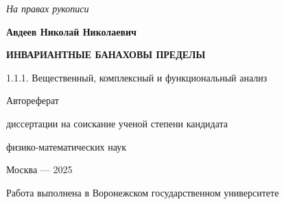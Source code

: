 \documentclass[12pt]{article}
\renewcommand{\baselinestretch}{1.3}
\begin{document}
\large

\thispagestyle{empty}

\begin{flushright}
\textit{На правах рукописи}
\end{flushright}

\vspace{25mm}

\begin{center}
\textbf{
	Авдеев Николай Николаевич
}
\end{center}

\vspace{25mm}

\begin{center}
\textbf{\MakeUppercase{
	Инвариантные банаховы пределы
}}
\end{center}

\vspace{10mm}

\begin{center}
	1.1.1. Вещественный, комплексный и функциональный анализ
\end{center}

\vspace{5mm}

\begin{center}
Автореферат

диссертации на соискание ученой степени кандидата

физико-математических наук
\end{center}

\vfill

\begin{center}
Москва --- 2025
\end{center}


\newpage
\thispagestyle{empty}

\renewcommand{\baselinestretch}{1}
\setlength{\parindent}{0pt}
\fontsize{13.4}{15}\selectfont

\begin{center}
	Работа выполнена в
	Воронежском государственном университете
\end{center}
\end{document}
